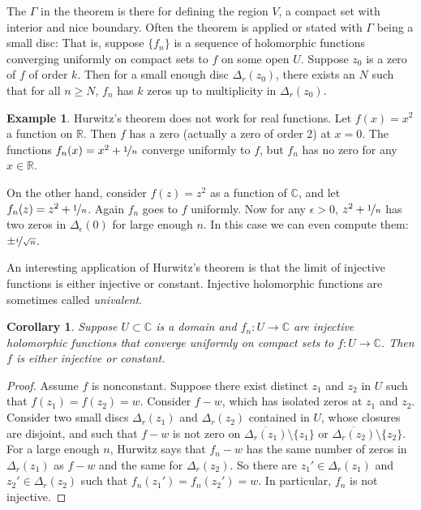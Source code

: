 \documentclass[12pt,openany]{book}
\newcommand{\C}{{\mathbb{C}}}
\newcommand{\R}{{\mathbb{R}}}
\newcommand{\myindex}[1]{#1\index{#1}}
\theoremstyle{plain}
\newtheorem{cor}[thm]{Corollary}
\theoremstyle{remark}
\theoremstyle{definition}
\theoremstyle{exercise}
\theoremstyle{example}
\newtheorem{example}[thm]{Example}
\begin{document}
The $\Gamma$ in the theorem is there for defining the region
$V$, a compact set with interior and nice boundary.
Often the theorem is applied or stated with $\Gamma$ being a small disc:
That is, suppose $\{ f_n \}$ is a sequence of holomorphic
functions converging uniformly
on compact sets to $f$ on some open $U$.  Suppose $z_0$ is a zero of
$f$ of order $k$.  Then for a small enough disc $\Delta_r(z_0)$,
there exists an $N$ such that
for all $n \geq N$, $f_n$ has $k$ zeros up to multiplicity in
$\Delta_r(z_0)$.

\begin{example}
Hurwitz's theorem does not work for real functions.  Let $f(x) =
x^2$ a function on $\R$.  Then $f$ has a zero (actually a zero of order 2)
at $x=0$.  The functions $f_n(x) = x^2+\nicefrac{1}{n}$ converge uniformly
to $f$, but $f_n$ has no zero for any $x \in \R$.

On the other hand, consider $f(z) = z^2$ as a function of $\C$, and let
$f_n(z) = z^2+\nicefrac{1}{n}$.  Again $f_n$ goes to $f$ uniformly.  Now for
any $\epsilon > 0$, $z^2+\nicefrac{1}{n}$ has
two zeros in $\Delta_\epsilon(0)$ for large enough $n$.  In this case we can even compute
them: $\pm \nicefrac{i}{\sqrt{n}}$.
\end{example}

An interesting application of Hurwitz's theorem is that the limit of
injective functions is either injective or constant.
Injective holomorphic
functions are sometimes called \emph{\myindex{univalent}}.

\begin{cor} \label{cor:univalentlimit}
Suppose $U \subset \C$ is a domain and $f_n \colon U \to \C$ are
injective holomorphic functions that converge uniformly on compact sets
to $f \colon U \to \C$.  Then $f$ is either injective or constant.
\end{cor}

\begin{proof}
Assume $f$ is nonconstant.
Suppose there exist distinct $z_1$ and $z_2$ in $U$ such that $f(z_1) =
f(z_2) = w$.  Consider $f-w$, which has isolated zeros at $z_1$ and $z_2$.
Consider two small discs $\Delta_r(z_1)$ and $\Delta_r(z_2)$ contained in
$U$, whose closures are disjoint,
and such that $f-w$ is not zero on
$\overline{\Delta_r(z_1)} \setminus \{ z_1 \}$ or
$\overline{\Delta_r(z_2)} \setminus \{ z_2 \}$.
For a large enough $n$, Hurwitz says that $f_n-w$ has the same number of
zeros in $\Delta_r(z_1)$ as $f-w$ and the same for $\Delta_r(z_2)$.
So there are $z_1' \in \Delta_r(z_1)$ and
$z_2' \in \Delta_r(z_2)$ such that $f_n(z_1')=f_n(z_2')=w$.
In particular, $f_n$ is not injective.
\end{proof}
\end{document}
